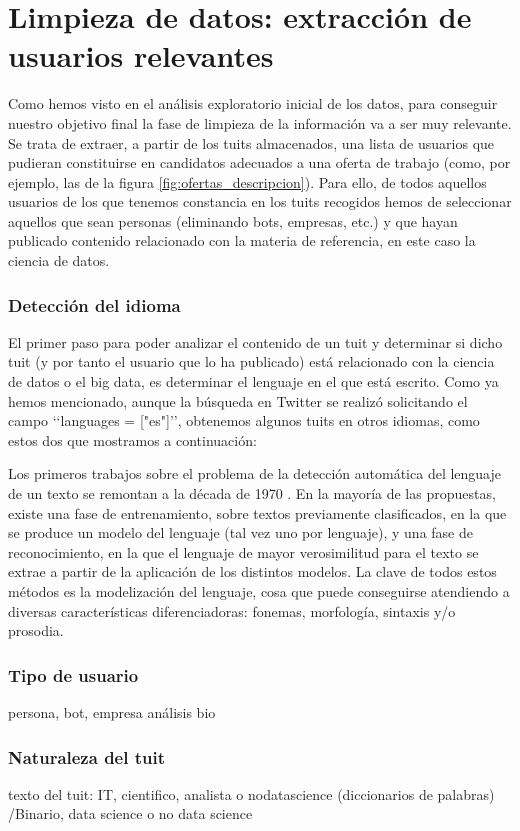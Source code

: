 
\chapter{Limpieza de datos: extracción de usuarios relevantes}
\label{chap:extraccion_de_usuarios}

Como hemos visto en el análisis exploratorio inicial de los datos, para conseguir
nuestro objetivo final la fase de limpieza de la información va a ser muy relevante.
Se trata de extraer, a partir de los tuits almacenados, una lista de usuarios 
que pudieran constituirse en candidatos adecuados a una oferta de trabajo (como, por ejemplo, las de la figura \ref{fig:ofertas_descripcion}). Para ello, de todos aquellos usuarios de los
que tenemos constancia en los tuits recogidos hemos de seleccionar aquellos que sean personas (eliminando bots, empresas, etc.) y que hayan publicado contenido relacionado con la materia de referencia, en este caso la ciencia de datos.



\subsection{Detección del idioma} 

El primer paso para poder analizar el contenido de un tuit y determinar si dicho tuit (y por tanto el usuario que lo ha publicado) está relacionado con la ciencia de datos o el big data,
es determinar el lenguaje en el que está escrito. Como ya hemos mencionado,
aunque la búsqueda en Twitter se realizó solicitando el campo \lq\lq languages = ["es"]\rq\rq,
obtenemos algunos tuits en otros idiomas, como estos dos 
que mostramos a continuación:


Los primeros trabajos sobre el problema de la detección automática del lenguaje de un texto
se remontan a la década de 1970 \cite{zissman-berkling}. En la mayoría de las propuestas, existe una fase de entrenamiento, sobre textos previamente clasificados, en la que se produce un modelo del lenguaje (tal vez uno por lenguaje), y una fase de reconocimiento, en la que el lenguaje de mayor verosimilitud para el texto se extrae a partir de la aplicación de los distintos modelos. La clave de todos estos métodos es la modelización del lenguaje, cosa que puede conseguirse atendiendo a diversas características diferenciadoras: fonemas, morfología, sintaxis y/o prosodia.



\subsection{Tipo de usuario}
persona, bot, empresa análisis bio

\subsection{Naturaleza del tuit}
texto del tuit:  IT, cientifico, analista o nodatascience (diccionarios de palabras)
					/Binario, data science o no data science
